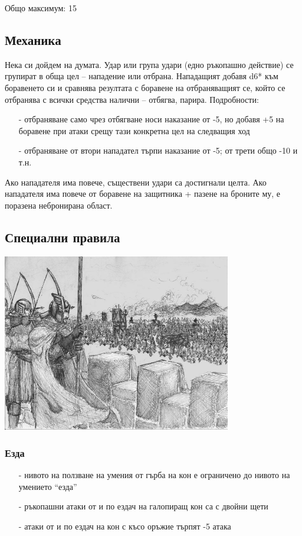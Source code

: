 Общо максимум: 15

\subsection{Механика}
Нека си дойдем на думата.
Удар или група удари (едно ръкопашно действие) се групират в обща цел – нападение или отбрана.
Нападащият добавя d6* към боравенето си и сравнява резултата с боравене на отбраняващият се, който се отбранява с всички средства налични – отбягва, парира.
Подробности:
\begin{itemize}
\item[-]{отбраняване само чрез отбягване носи наказание от -5, но добавя +5 на боравене при атаки срещу тази конкретна цел на следващия ход}
\item[-]{отбраняване от втори нападател търпи наказание от -5; от трети общо -10 и т.н.}
\end{itemize}

Ако нападателя има повече, съществени удари са достигнали целта.
Ако нападателя има повече от боравене на защитника + пазене на броните му, е поразена небронирана област.

\subsection{Специални правила}
\begin{center}
\includegraphics[width=0.75\textwidth]{../images/siege}~
\\[1cm]
\end{center}

\subsubsection{Езда}
\begin{itemize}
\item[-]{нивото на ползване на умения от гърба на кон е ограничено до нивото на умението “езда”}
\item[-]{ръкопашни атаки от и по ездач на галопиращ кон са с двойни щети}
\item[-]{атаки от и по ездач на кон с късо оръжие търпят -5 атака}
\end{itemize}

